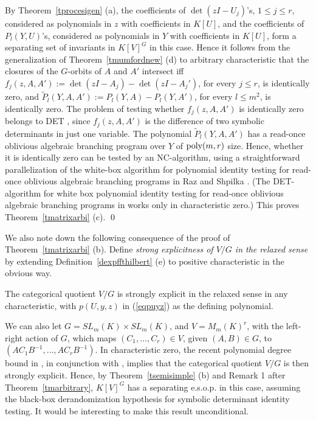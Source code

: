 \documentclass[11pt]{article}
\begin{document}
By Theorem~\ref{tprocesigen} (a), 
the coefficients
of $\det(z I - U_j)$'s, $1 \le j \le r$, considered as  polynomials in $z$ with coefficients in $K[U]$, 
and the coefficients of $P_l(Y,U)$'s, considered as  polynomials in $Y$ with coefficients in $K[U]$, form
a separating set of invariants in $K[V]^G$ in this case.
Hence it follows from the generalization of Theorem~\ref{tmumfordnew} (d) 
to  arbitrary characteristic \cite{mumford} 
that the closures of the $G$-orbits of $A$ and $A'$  intersect iff 
$f_j(z,A,A'):=\det(z I - A_j) -\det(z I - A_j')$, for every  $j \le r$, is identically zero, and
$\tilde P_l(Y,A,A') := P_l(Y,A) - P_l(Y,A')$, for every  $l \le m^2$, is identically zero. 
The problem of testing whether $f_j(z,A,A')$ is identically zero belongs to DET \cite{cook},
since $f_j(z,A,A')$ is the difference of two symbolic determinants in just one variable. 
The polynomial $\tilde P_l(Y,A,A')$ has a read-once oblivious algebraic branching program over $Y$ of 
${\mbox {poly}}(m,r)$ size. Hence, whether it is identically zero can be tested by an NC-algorithm,
using a straightforward parallelization of the white-box algorithm for polynomial identity testing
for read-once oblivious algebraic branching programs in Raz and Shpilka \cite{raz}. 
(The DET-algorithm for white box polynomial identity testing for read-once oblivious algebraic branching 
programs in  \cite{arvind} works only in characteristic zero.) 
This proves Theorem~\ref{tmatrixarbi} (c). 
\qed

We also note down the following consequence of the proof of Theorem~\ref{tmatrixarbi} (b). 
Define {\em strong explicitness of $V/G$ in the relaxed sense}  by extending 
Definition~\ref{dexpffthilbert} (e) to positive characteristic in 
the obvious way.

\begin{theorem} \label{texprelaxedmatrix}
The categorical quotient $V/G$ is strongly explicit  in the  relaxed sense in
any characteristic, 
with $p(U,y,z)$ in (\ref{eqpuyz}) as the defining polynomial.
\end{theorem}


We can also let $G= SL_m(K) \times SL_m(K)$, and $V=M_m(K)^r$, with the 
left-right action of $G$, which maps 
$(C_1, \ldots, C_r) \in V$, given $(A,B) \in G$, to $(A C_1 B^{-1}, \ldots, A C_r B^{-1})$.  In
characteristic zero, the recent polynomial degree bound 
in  \cite{makam,IQS},
in conjunction with  \cite{weyman,zubkov}, implies that
the categorical quotient $V/G$ is then strongly explicit. Hence, by 
Theorem~\ref{tsemisimple} (b) and 
Remark 1 after Theorem~\ref{tmarbitrary}, $K[V]^G$ has a separating e.s.o.p. in this case, 
 assuming the black-box derandomization hypothesis for symbolic determinant identity 
testing. It would be interesting to make this result unconditional.
\end{document}
